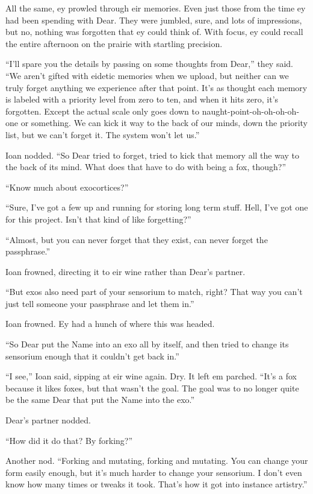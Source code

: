 All the same, ey prowled through eir memories. Even just those from the time ey had been spending with Dear. They were jumbled, sure, and lots of impressions, but no, nothing was forgotten that ey could think of. With focus, ey could recall the entire afternoon on the prairie with startling precision.

``I'll spare you the details by passing on some thoughts from Dear,'' they said. ``We aren't gifted with eidetic memories when we upload, but neither can we truly forget anything we experience after that point. It's as thought each memory is labeled with a priority level from zero to ten, and when it hits zero, it's forgotten. Except the actual scale only goes down to naught-point-oh-oh-oh-oh-one or something. We can kick it way to the back of our minds, down the priority list, but we can't forget it. The system won't let us.''

Ioan nodded. ``So Dear tried to forget, tried to kick that memory all the way to the back of its mind. What does that have to do with being a fox, though?''

``Know much about exocortices?''

``Sure, I've got a few up and running for storing long term stuff. Hell, I've got one for this project. Isn't that kind of like forgetting?''

``Almost, but you can never forget that they exist, can never forget the passphrase.''

Ioan frowned, directing it to eir wine rather than Dear's partner.

``But exos also need part of your sensorium to match, right? That way you can't just tell someone your passphrase and let them in.''

Ioan frowned. Ey had a hunch of where this was headed.

``So Dear put the Name into an exo all by itself, and then tried to change its sensorium enough that it couldn't get back in.''

``I see,'' Ioan said, sipping at eir wine again. Dry. It left em parched. ``It's a fox because it likes foxes, but that wasn't the goal. The goal was to no longer quite be the same Dear that put the Name into the exo.''

Dear's partner nodded.

``How did it do that? By forking?''

Another nod. ``Forking and mutating, forking and mutating. You can change your form easily enough, but it's much harder to change your sensorium. I don't even know how many times or tweaks it took. That's how it got into instance artistry.''

